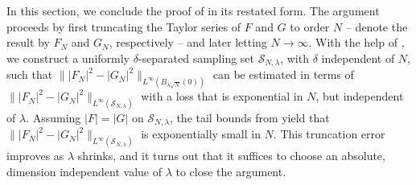 \documentclass[11pt]{amsart}
\begin{document}
In this section, we conclude the proof of  in its restated form. The argument proceeds by first truncating the Taylor series of $F$ and $G$ to order $N$ -- denote the result by $F_N$ and $G_N$, respectively -- and later letting $N \to \infty$. With the help of , we construct a uniformly $\delta$-separated sampling set $\mathcal S_{N,\lambda}$, with $\delta$ independent of $N$, such that $\||F_N|^2-|G_N|^2\|_{L^\infty(B_{\lambda \sqrt{N}}(0))}$ can be estimated in terms of $\||F_N|^2-|G_N|^2\|_{L^\infty(\mathcal S_{N,\lambda})}$ with a loss that is exponential in $N$, but independent of $\lambda$. Assuming $|F|=|G|$ on $\mathcal S_{N,\lambda}$, the tail bounds from  yield that $\||F_N|^2-|G_N|^2\|_{L^\infty(\mathcal S_{N,\lambda})}$ is exponentially small in $N$. This truncation error improves as $\lambda$ shrinks, and it turns out that it suffices to choose an absolute, dimension independent value of $\lambda$ to close the argument.
\end{document}
